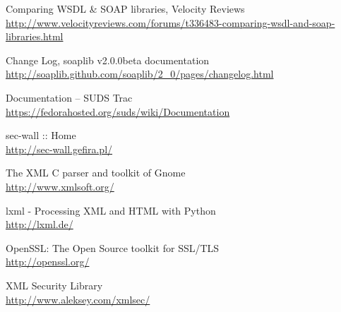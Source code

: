 \begin{thebibliography}{99}
Comparing WSDL & SOAP libraries, Velocity Reviews\\
\url{http://www.velocityreviews.com/forums/t336483-comparing-wsdl-and-soap-libraries.html}

Change Log, soaplib v2.0.0beta documentation\\
\url{http://soaplib.github.com/soaplib/2_0/pages/changelog.html}

Documentation -- SUDS Trac\\
\url{https://fedorahosted.org/suds/wiki/Documentation}

sec-wall :: Home\\
\url{http://sec-wall.gefira.pl/}

The XML C parser and toolkit of Gnome\\
\url{http://www.xmlsoft.org/}

lxml - Processing XML and HTML with Python\\
\url{http://lxml.de/}

OpenSSL: The Open Source toolkit for SSL/TLS\\
\url{http://openssl.org/}

XML Security Library\\
\url{http://www.aleksey.com/xmlsec/}

\end{thebibliography}
